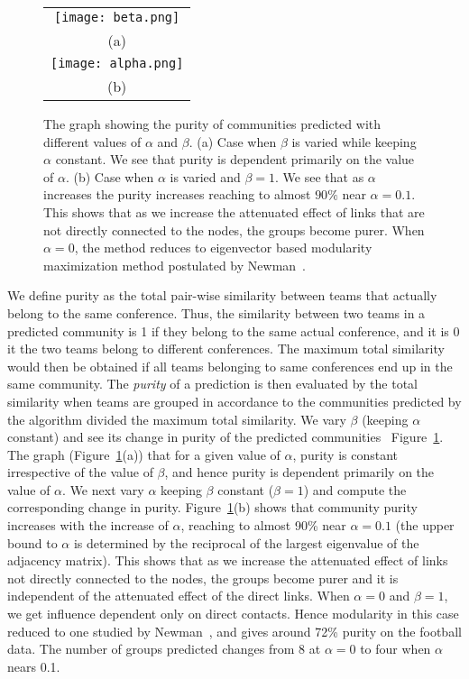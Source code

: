 \documentclass{sig-alternate}
\newcommand{\figref}[1]{Figure~\ref{#1}}
\begin{document}
 \begin{figure}[tbhp]
 \begin{tabular}{c}
   \texttt{[image: beta.png]}  \\
   (a)\\
   \texttt{[image: alpha.png]} \\
   (b)
 \end{tabular}
 \caption{The graph showing the purity of communities predicted  with different values of $\alpha$ and $\beta$. (a) Case when $\beta$ is varied while keeping $\alpha$ constant. We see that purity is dependent primarily on the value of $\alpha$.
 (b) Case when $\alpha$ is varied and $\beta=1$. We see that as $\alpha$ increases the purity increases reaching to almost $90\%$ near $\alpha=0.1$. This shows that as we increase the attenuated effect of links that are not directly connected to the nodes, the groups become purer. When $\alpha=0$, the method reduces to  eigenvector based modularity maximization method postulated by Newman~\protect\cite{Newman206}.}
 \label{fig:football}
 \end{figure}

We define purity as the total pair-wise similarity between teams that actually belong to the same conference. Thus, the similarity between two teams in a predicted community is 1 if they belong to the same actual conference, and it is 0 it the two teams belong to different conferences. The maximum total similarity would then be obtained if all teams belonging to same conferences end up in the same community. The \emph{purity} of a prediction is then evaluated by the total similarity when teams are grouped in accordance to the communities predicted by the algorithm divided the maximum total similarity. We vary $\beta$ (keeping $\alpha$ constant) and see its change in purity of the predicted communities ~\figref{fig:football}. The graph (\figref{fig:football}(a)) that for a given value of $\alpha$,  purity is constant irrespective of the value of $\beta$, and  hence  purity is dependent primarily on the value of $\alpha$. We next  vary $\alpha$ keeping  $\beta$ constant ($\beta=1$) and compute the corresponding change in purity. \figref{fig:football}(b) shows that community purity increases with the increase of $\alpha$, reaching to almost 90\% near $\alpha=0.1$ (the upper  bound to $\alpha$ is determined by the reciprocal of the largest eigenvalue of the adjacency matrix).  This shows that as we increase the attenuated effect of links not directly connected to the nodes, the groups become purer and it is independent of the attenuated effect of the direct links. When $\alpha=0$ and $\beta=1$,  we get influence dependent only on direct contacts. Hence modularity in this case reduced to one studied by Newman~\cite{Newman206}, and gives around 72\% purity on the football data. The number of groups predicted changes from 8 at $\alpha=0$ to four when $\alpha$ nears 0.1.
\end{document}
